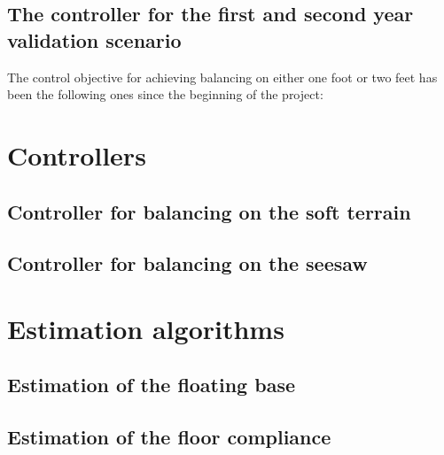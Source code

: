 \documentclass[12pt,a4paper,twoside]{article}
\begin{document}
\subsection{The controller for the first and second year validation scenario} 
\label{sec:firstSecondValid}
The control objective for achieving balancing on either one foot or two feet has been the following ones since the beginning of the project:
\begin{figure}[t]
\end{figure}

\section{Controllers} 
\label{sec:controllers}

\subsection{Controller for balancing on the soft terrain} 
\label{sec:controllerSoftTerrain}

\subsection{Controller for balancing on the seesaw} 
\label{sec:controllerSeeSaw}

\section{Estimation algorithms} 
\label{sec:estimation}

\subsection{Estimation of the floating base} 
\label{sec:estimationFloatingBase}

\subsection{Estimation of the floor compliance} 
\label{sec:estimationFloorCompliance}



\end{document}
